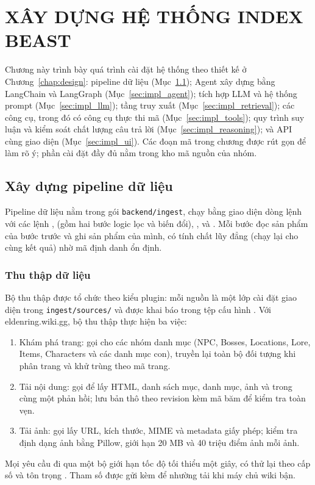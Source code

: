 \chapter{XÂY DỰNG HỆ THỐNG INDEX BEAST}
\label{chap:impl}

Chương này trình bày quá trình cài đặt hệ thống theo thiết kế ở Chương~\ref{chap:design}: pipeline dữ liệu (Mục~\ref{sec:impl_data}); Agent xây dựng bằng LangChain và LangGraph (Mục~\ref{sec:impl_agent}); tích hợp LLM và hệ thống prompt (Mục~\ref{sec:impl_llm}); tầng truy xuất (Mục~\ref{sec:impl_retrieval}); các công cụ, trong đó có công cụ thực thi mã  (Mục~\ref{sec:impl_tools}); quy trình suy luận và kiểm soát chất lượng câu trả lời (Mục~\ref{sec:impl_reasoning}); và API cùng giao diện (Mục~\ref{sec:impl_ui}). Các đoạn mã trong chương được rút gọn để làm rõ ý; phần cài đặt đầy đủ nằm trong kho mã nguồn của nhóm.

\section{Xây dựng pipeline dữ liệu}
\label{sec:impl_data}

Pipeline dữ liệu nằm trong gói \nolinkurl{backend/ingest}, chạy bằng giao diện dòng lệnh  với các lệnh ,  (gồm hai bước logic lọc và biến đổi), ,  và . Mỗi bước đọc sản phẩm của bước trước và ghi sản phẩm của mình, có tính chất lũy đẳng (chạy lại cho cùng kết quả) nhờ mã định danh ổn định.

\subsection{Thu thập dữ liệu}
\label{sec:impl_crawl}

Bộ thu thập được tổ chức theo kiểu plugin: mỗi nguồn là một lớp cài đặt giao diện  trong \nolinkurl{ingest/sources/} và được khai báo trong tệp cấu hình . Với eldenring.wiki.gg, bộ thu thập thực hiện ba việc:
\begin{enumerate}
    \item Khám phá trang: gọi  cho các nhóm danh mục (NPC, Bosses, Locations, Lore, Items, Characters và các danh mục con), truyền lại toàn bộ đối tượng  khi phân trang và khử trùng theo mã trang.
    \item Tải nội dung: gọi  để lấy HTML, danh sách mục, danh mục, ảnh và  trong cùng một phản hồi; lưu bản thô theo revision kèm mã băm để kiểm tra toàn vẹn.
    \item Tải ảnh: gọi  lấy URL, kích thước, MIME và metadata giấy phép; kiểm tra định dạng ảnh bằng Pillow, giới hạn 20 MB và 40 triệu điểm ảnh mỗi ảnh.
\end{enumerate}
Mọi yêu cầu đi qua một bộ giới hạn tốc độ tối thiểu một giây, có thử lại theo cấp số và tôn trọng . Tham số  được gửi kèm để nhường tải khi máy chủ wiki bận.

